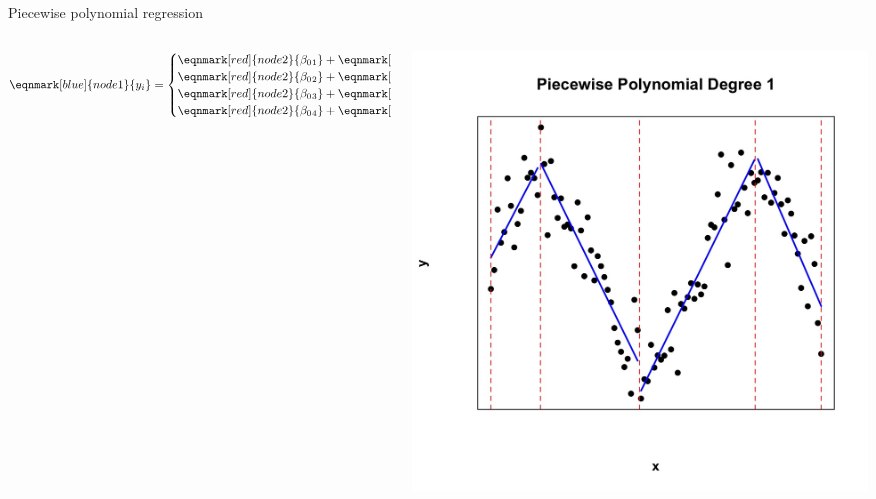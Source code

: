 \documentclass[english]{beamer}
\begin{document}
\begin{frame}{Piecewise polynomial regression}
     \centering
     \begin{columns}
         \begin{column}{0.55\textwidth}
     {\scriptsize
          \begin{equation*}
             \eqnmark[blue]{node1}{y_i}=
               \begin{cases} 
                  \eqnmark[red]{node2}{\beta_0{}_1} + 
                  \eqnmark[purple]{node3}{\beta_{11}x} + 
                  \eqnmark[orange]{node4}{\epsilon} & \text{if } 
                  \eqnmark{node5}{x < \xi_1,} \\
                  \eqnmark[red]{node2}{\beta_0{}_2} + 
                  \eqnmark[purple]{node3}{\beta_{12}x} + 
                  \eqnmark[orange]{node4}{\epsilon} & \text{if } 
                  \eqnmark{node5}{\xi_1 \geq x < \xi_2,} \\
                  \eqnmark[red]{node2}{\beta_0{}_3} + 
                  \eqnmark[purple]{node3}{\beta_{13}x} + 
                  \eqnmark[orange]{node4}{\epsilon} & \text{if } 
                  \eqnmark{node5}{\xi_2\geq x < \xi_3,} \\
                  \eqnmark[red]{node2}{\beta_0{}_4} + 
                  \eqnmark[purple]{node3}{\beta_{14}x} + 
                  \eqnmark[orange]{node4}{\epsilon} & \text{if } 
                  \eqnmark{node5}{\xi_3 \geq x < \xi_4.} 
              \end{cases}
          \end{equation*}
          }
          \end{column}
          \begin{column}{0.5\textwidth}
             \centering
            \includegraphics[width=\linewidth, height=0.6\textheight, keepaspectratio]{images/piecewise_degree_1.jpeg}  

\end{column}
\end{columns}
\end{frame}
\end{document}
